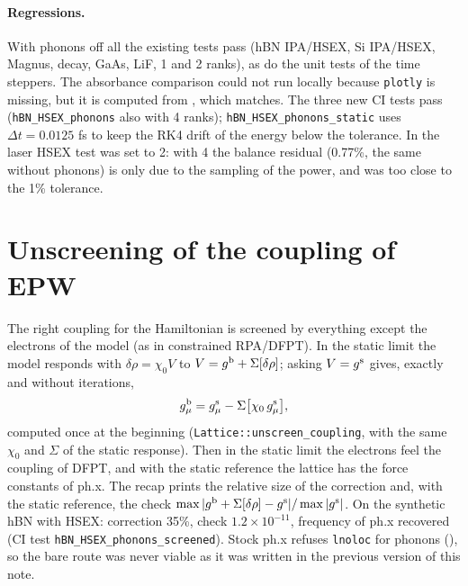 \documentclass[11pt]{article}
\begin{document}
\paragraph{Regressions.} With phonons off all the existing tests pass (hBN IPA/HSEX, Si IPA/HSEX, Magnus, decay,
GaAs, LiF, 1 and 2 ranks), as do the unit tests of the time steppers. The absorbance comparison could not run locally
because \texttt{plotly} is missing, but it is computed from , which matches. The three new CI tests pass
(\texttt{hBN\_HSEX\_phonons} also with 4 ranks); \texttt{hBN\_HSEX\_phonons\_static} uses $\Delta t=0.0125$ fs to keep the
RK4 drift of the energy below the tolerance. In the laser HSEX test  was set to 2: with 4 the balance residual (0.77\%, the same
without phonons) is only due to the sampling of the power, and was too close to the 1\% tolerance.

\section{Unscreening of the coupling of EPW}\label{sec:unscreening}
The right coupling for the Hamiltonian is screened by everything except the electrons of the model (as in constrained
RPA/DFPT). In the static limit the model responds with $\delta\rho=\chi_0V$ to $V=g^{\rm b}+\Sigma[\delta\rho]$; asking
$V=g^{\rm s}$ gives, exactly and without iterations,
\begin{equation}
g^{\rm b}_\mu = g^{\rm s}_\mu - \Sigma\big[\chi_0\,g^{\rm s}_\mu\big],
\end{equation}
computed once at the beginning (\texttt{Lattice::unscreen\_coupling}, with the same $\chi_0$ and $\Sigma$ of the static
response). Then in the static limit the electrons feel the coupling of DFPT, and with the static reference the lattice has
the force constants of ph.x. The recap prints the relative size of the correction and, with the static reference, the
check $\max|g^{\rm b}+\Sigma[\delta\rho]-g^{\rm s}|/\max|g^{\rm s}|$. On the synthetic hBN with HSEX: correction
35\%, check $1.2\times10^{-11}$, frequency of ph.x recovered (CI test \texttt{hBN\_HSEX\_phonons\_screened}).
Stock ph.x refuses \texttt{lnoloc} for phonons (), so the bare route was never viable as it was
written in the previous version of this note.
\end{document}
